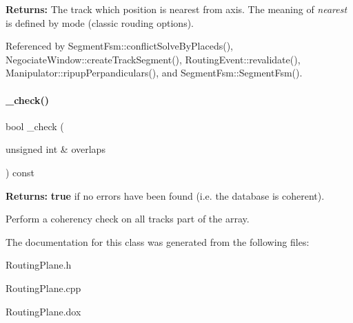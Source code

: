{\bfseries Returns\+:} The track which position is nearest from {\ttfamily axis}. The meaning of {\itshape nearest} is defined by {\ttfamily mode} (classic rouding options). 

Referenced by Segment\+Fsm\+::conflict\+Solve\+By\+Placeds(), Negociate\+Window\+::create\+Track\+Segment(), Routing\+Event\+::revalidate(), Manipulator\+::ripup\+Perpandiculars(), and Segment\+Fsm\+::\+Segment\+Fsm().

\mbox{\label{classKite_1_1RoutingPlane_aeea9a19f9b402ffe42c011c9afc2ca73}} 
\paragraph{\texorpdfstring{\+\_\+check()}{\_check()}}
{\footnotesize\ttfamily bool \+\_\+check (\begin{DoxyParamCaption}\item[{unsigned int \&}]{overlaps }\end{DoxyParamCaption}) const}

{\bfseries Returns\+:} {\bfseries true} if no errors have been found (i.\+e. the database is coherent).

Perform a coherency check on all tracks part of the array. 

The documentation for this class was generated from the following files\+:\begin{DoxyCompactItemize}
\item 
Routing\+Plane.\+h\item 
Routing\+Plane.\+cpp\item 
Routing\+Plane.\+dox\end{DoxyCompactItemize}
